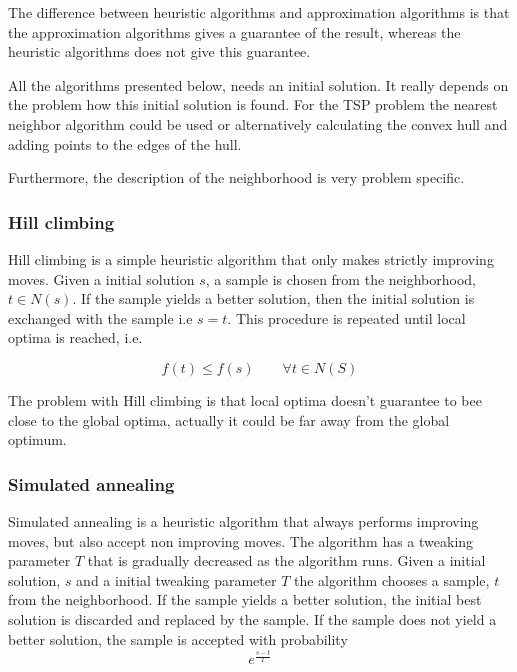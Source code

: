 \documentclass[10pt]{article}
\begin{document}
The difference between heuristic algorithms and approximation algorithms is that the approximation algorithms gives a guarantee of the result, whereas the heuristic algorithms does not give this guarantee.  

All the algorithms presented below, needs an initial solution. It really depends on the problem how this initial solution is found. For the TSP problem the nearest neighbor algorithm could be used or alternatively calculating the convex hull and adding points to the edges of the hull.

Furthermore, the description of the neighborhood is very problem specific.

\subsubsection{Hill climbing} %
\label{ssub:hill_climbing}
Hill climbing is a simple heuristic algorithm that only makes strictly improving moves. Given a initial solution $s$, a sample is chosen from the neighborhood, $t \in N(s)$. If the sample yields a better solution, then the initial solution is exchanged with the sample i.e $s=t$. This procedure is repeated until local optima is reached, i.e. 

\begin{equation}
  f(t) \leq f(s) \qquad \forall t \in N(S)
\end{equation}

The problem with Hill climbing is that local optima doesn't guarantee to bee close to the global optima, actually it could be far away from the global optimum.


\subsubsection{Simulated annealing} %
\label{ssub:simulated_annuealing}
Simulated annealing is a heuristic algorithm that always performs improving moves, but also accept non improving moves. The algorithm has a tweaking parameter $T$ that is gradually decreased as the algorithm runs. Given a initial solution, $s$ and a initial tweaking parameter $T$ the algorithm chooses a sample, $t$ from the neighborhood. If the sample yields a better solution, the initial best solution is discarded and replaced by the sample. If the sample does not yield a better solution, the sample is accepted with probability
\begin{equation}
  e^{\frac{s-t}{T}}
\end{equation}
\end{document}
